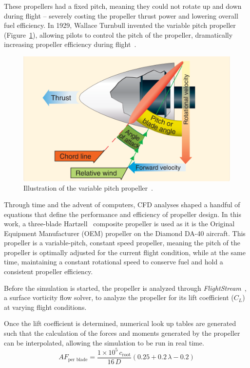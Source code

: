 These propellers had a fixed pitch, meaning they could not rotate up and down during flight {--} severely costing the propeller thrust power and lowering overall fuel efficiency. In 1929, Wallace Turnbull invented the variable pitch propeller (Figure~\ref{fig:variablepitchprop}), allowing pilots to control the pitch of the propeller, dramatically increasing propeller efficiency during flight~\cite{ianShortHistoryAircraft2018}.

\begin{figure}[!ht]
    \centering
    \includegraphics[width=0.8\linewidth]{Figures/variablepitchprop.png}
    \caption{Illustration of the variable pitch propeller~\cite{AerodynamicsPropellerBasics2016}.}\label{fig:variablepitchprop}
\end{figure}

Through time and the advent of computers, CFD analyses shaped a handful of equations that define the performance and efficiency of propeller design. In this work, a three-blade Hartzell~\cite{HartzellPropellerInc1969} composite propeller is used as it is the Original Equipment Manufacturer (OEM) propeller on the Diamond DA-40 aircraft. This propeller is a variable-pitch, constant speed propeller, meaning the pitch of the propeller is optimally adjusted for the current flight condition, while at the same time, maintaining a constant rotational speed to conserve fuel and hold a consistent propeller efficiency.

Before the simulation is started, the propeller is analyzed through \textit{FlightStream}~\cite{FlightStream2022}, a surface vorticity flow solver, to analyze the propeller for its lift coefficient (\(C_L\)) at varying flight conditions.

Once the lift coefficient is determined, numerical look up tables are generated such that the calculation of the forces and moments generated by the propeller can be interpolated, allowing the simulation to be run in real time.
\begin{equation}\label{eq:activityfactor}
    AF_{\textrm{per blade}} = \frac{1 \times 10^5 \, c_{\textrm{root}}}{16 \, D} \left(0.25 + 0.2 \, \lambda - 0.2 \right)
\end{equation}

